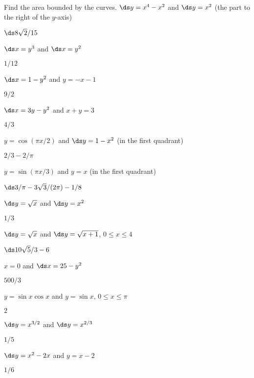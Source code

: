 \begin{exercises}

Find the area bounded by the curves.
\nobreak
\exercise $\ds y=x^4-x^2$ and $\ds y=x^2$ (the part to the right of the $y$-axis)
\begin{answer} $\ds 8\sqrt2/15$
\end{answer}

\exercise $\ds x=y^3$ and $\ds x=y^2$
\begin{answer} $1/12$
\end{answer}

\exercise $\ds x=1-y^2$ and $y=-x-1$
\begin{answer} $9/2$
\end{answer}

\exercise $\ds x=3y-y^2$ and $x+y=3$
\begin{answer} $4/3$
\end{answer}

\exercise $y=\cos(\pi x/2)$ and $\ds y=1- x^2$ (in the first quadrant)
\begin{answer} $2/3-2/\pi$
\end{answer}

\exercise $y=\sin(\pi x/3)$ and $y=x$ (in the first quadrant)
\begin{answer} $\ds 3/\pi - 3\sqrt3/(2\pi)-1/8$
\end{answer}

\exercise $\ds y=\sqrt{x}$ and $\ds y=x^2$
\begin{answer} $1/3$
\end{answer}

\exercise $\ds y=\sqrt x$ and $\ds y=\sqrt{x+1}$, $0\le x\le 4$
\begin{answer} $\ds 10\sqrt{5}/3-6$
\end{answer}

\exercise $x=0$ and $\ds x=25-y^2$
\begin{answer} $500/3$
\end{answer}

\exercise $y=\sin x\cos x$ and $y=\sin x$, $0\le x\le \pi$
\begin{answer} $2$
\end{answer}

\exercise $\ds y=x^{3/2}$ and $\ds y=x^{2/3}$
\begin{answer} $1/5$
\end{answer}

\exercise $\ds y=x^2-2x$ and $y=x-2$
\begin{answer} $1/6$
\end{answer}


\end{exercises}
